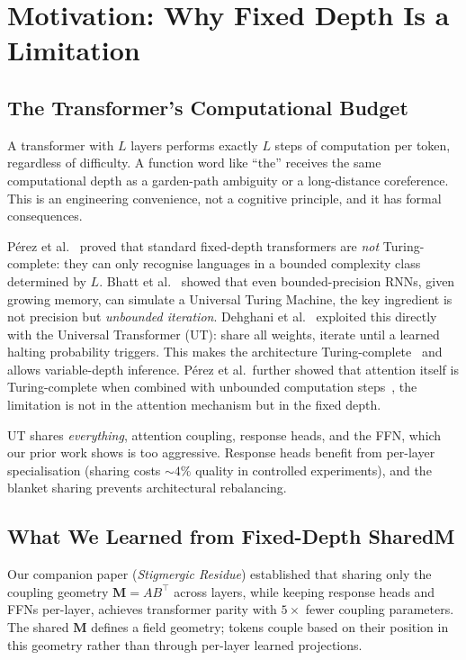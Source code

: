\documentclass[11pt, a4paper]{article}
\newcommand{\M}{\mathbf{M}}
\theoremstyle{plain}
\theoremstyle{definition}
\theoremstyle{remark}
\begin{document}
\section{Motivation: Why Fixed Depth Is a Limitation}

\subsection{The Transformer's Computational Budget}

A transformer with $L$ layers performs exactly $L$ steps of computation per token, regardless of difficulty.
A function word like ``the'' receives the same computational depth as a garden-path ambiguity or a long-distance coreference.
This is an engineering convenience, not a cognitive principle, and it has formal consequences.

P\'{e}rez et al.~\cite{perez2019turing} proved that standard fixed-depth transformers are \emph{not} Turing-complete: they can only recognise languages in a bounded complexity class determined by $L$.
Bhatt et al.~\cite{bhatt2020turing} showed that even bounded-precision RNNs, given growing memory, can simulate a Universal Turing Machine, the key ingredient is not precision but \emph{unbounded iteration}.
Dehghani et al.~\cite{dehghani2018universal} exploited this directly with the Universal Transformer (UT): share all weights, iterate until a learned halting probability triggers.
This makes the architecture Turing-complete~\cite{perez2019turing} and allows variable-depth inference.
P\'{e}rez et al.\ further showed that attention itself is Turing-complete when combined with unbounded computation steps~\cite{perez2021attention}, the limitation is not in the attention mechanism but in the fixed depth.

UT shares \emph{everything}, attention coupling, response heads, and the FFN, which our prior work shows is too aggressive.
Response heads benefit from per-layer specialisation (sharing costs ${\sim}4\%$ quality in controlled experiments), and the blanket sharing prevents architectural rebalancing.

\subsection{What We Learned from Fixed-Depth SharedM}

Our companion paper (\textit{Stigmergic Residue}) established that sharing only the coupling geometry $\M = AB^\top$ across layers, while keeping response heads and FFNs per-layer, achieves transformer parity with $5\times$ fewer coupling parameters.
The shared $\M$ defines a field geometry; tokens couple based on their position in this geometry rather than through per-layer learned projections.
\end{document}
